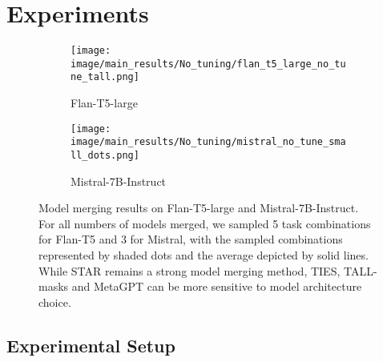 \section{Experiments}


\begin{figure*}[t]
\vspace{-0.5em}
\begin{subfigure}{0.48\textwidth}
\texttt{[image: image/main\_results/No\_tuning/flan\_t5\_large\_no\_tune\_tall.png]} 
\caption{Flan-T5-large}
\end{subfigure}
\begin{subfigure}{0.48\textwidth}
\texttt{[image: image/main\_results/No\_tuning/mistral\_no\_tune\_small\_dots.png]}
\caption{Mistral-7B-Instruct}
\label{fig:main_mist}
\end{subfigure}
\caption{Model merging results on Flan-T5-large and Mistral-7B-Instruct. For all numbers of models merged, we sampled 5 task combinations for Flan-T5 and 3 for Mistral, with the sampled combinations represented by shaded dots and the average depicted by solid lines. While STAR remains a strong model merging method, TIES, TALL-masks and MetaGPT can be more sensitive to model architecture choice.}
\label{fig:main_datafree}
\vspace{-0.5em}
\end{figure*}






\subsection{Experimental Setup}

